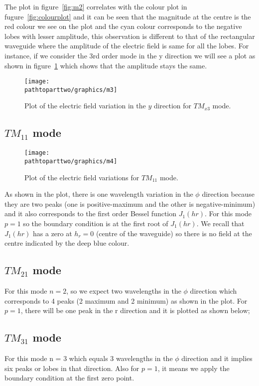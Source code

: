 The plot in figure~\ref{fig:m2} correlates with the colour plot in fugure~\ref{fig:colourplot} and it can be seen that the magnitude at the centre is the red colour we see on the plot and the cyan colour corresponds to the negative lobes with lesser amplitude, this observation is different to that of the rectangular waveguide where the amplitude of the electric field is same for all the lobes. For instance, if we consider the 3rd order mode in the y direction we will see a plot as shown in figure~\ref{fig:m3} which shows that the amplitude stays the same.
\begin{figure}[h]
\centering
\texttt{[image: \\pathtoparttwo/graphics/m3]}
\caption{Plot of the electric field variation in the $y$ direction for $TM_{x3}$ mode.}
\label{fig:m3}
\end{figure}

\subsection{$TM_{11}$ mode}
\begin{figure}[h]
\centering
\texttt{[image: \\pathtoparttwo/graphics/m4]}
\caption{Plot of the electric field variations for $TM_{11}$ mode.}
\label{fig:m4}
\end{figure}

As shown in the plot, there is one wavelength variation in the $\phi$ direction because they are two peaks (one is positive-maximum and the other is negative-minimum) and it also corresponds to the first order Bessel function $J_1(hr)$. For this mode $p =1$  so the boundary condition is at the first root of $J_1(hr).$ We recall that $J_1(hr)$ has a zero at $h_r =0$ (centre of the waveguide) so there is no field at the centre indicated by the deep blue colour.

\subsection{$TM_{21}$ mode}
For this mode $n=2$, so we expect two wavelengths in the $\phi$ direction which corresponds to 4 peaks (2 maximum and 2 minimum) as shown in the plot. For  $p = 1$, there will be one peak in the r direction and it is plotted as shown below;

\subsection{$TM_{31}$ mode}
For this mode n = 3 which equals 3 wavelengths in the $\phi$ direction and it implies six peaks or lobes in that direction. Also for $p = 1$, it means we apply the boundary condition at the first zero point.

